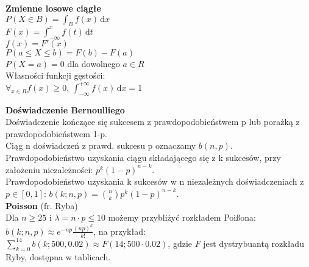 \documentclass[10pt,landscape,a4paper,notitlepage]{article}
\begin{document}
\begin{multicols*}{4}
        \noindent \textbf{\large Zmienne losowe ciągłe}\\
        $P(X\in B)=\int_{B} f(x)\,\mathrm{d}x$\\
        $F(x)=\int_{-\infty}^xf(t)\,\mathrm{d}t$\\
        $f(x)=F'(x)$\\
        $P(a\leq X\leq b)=F(b)-F(a)$\\
        $P(X = a)=0$ dla dowolnego $a\in R$\\
        Własności funkcji gęstości:\\
        $\forall_{x\in R}f(x)\geq 0$, $\int_{-\infty}^{+\infty}f(x)\,\mathrm{d}x=1$

        \noindent \textbf{\large Doświadczenie Bernoulliego}\\
        Doświadczenie kończące się sukcesem z prawdopodobieństwem p lub porażką z prawdopodobieństwem 1-p.\\
        Ciąg n doświadczeń z prawd. sukcesu p oznaczamy $b(n,p)$.\\
        Prawdopodobieństwo uzyskania ciągu składającego się z k sukcesów, przy założeniu niezależności: $p^k(1-p)^{n-k}$.\\
        Prawdopodobieństwo uzyskania k sukcesów w n niezależnych doświadczeniach z $p\in[0,1]$: $b(k;n,p)=\binom{n}{k}p^k(1-p)^{n-k}$.\\
        \textbf{Poisson} (fr. Ryba)\\
        Dla $n\geq25$ i $\lambda = n\cdot p \leq10$ możemy przybliżyć rozkładem Poi\ss ona: $b(k;n,p)\approx e^{-np}\frac{(np)^k}{k!}$, na przykład:\\
        $\sum_{k=0}^{14}b(k;500,0.02)\approx F(14;500\cdot0.02)$, gdzie $F$ jest dystrybuantą rozkładu Ryby, dostępna w tablicach.
    \end{multicols*}
\end{document}
